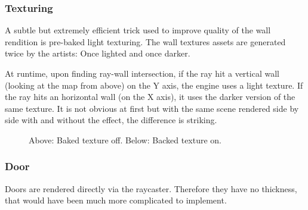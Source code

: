 \subsubsection{Texturing}
A subtle but extremely efficient trick used to improve quality of the wall rendition is pre-baked light texturing. The wall textures assets are generated twice by the artists: Once lighted and once darker.\\
  \begin{figure}[H]
\centering
 \end{figure}
\par
  \begin{figure}[H]
\centering
 \end{figure}
\par
At runtime, upon finding ray-wall intersection, if the ray hit a vertical wall (looking at the map from above) on the Y axis, the engine uses a light texture. If the ray hits an horizontal wall (on the X axis), it uses the darker version of the same texture. It is not obvious at first but with the same scene rendered side by side with and without the effect, the difference is striking.\\
\begin{minipage}{\textwidth}
\begin{figure}[H]
\centering
 \caption{Above: Baked texture off. Below: Backed texture on.}
 \end{figure}

\begin{figure}[H]
\centering
 
 \end{figure}
 \end{minipage}

 





\subsubsection{Door}
Doors are rendered directly via the raycaster. Therefore they have no thickness, that would have been much more complicated to implement.\\
\par
\begin{figure}[H]
 \centering
\end{figure}

